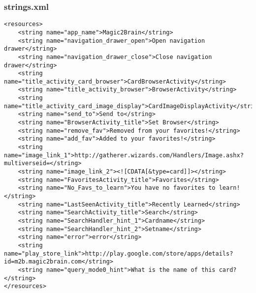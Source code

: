 \subsubsection*{strings.xml}
\begin{lstlisting}
<resources>
    <string name="app_name">Magic2Brain</string>
    <string name="navigation_drawer_open">Open navigation drawer</string>
    <string name="navigation_drawer_close">Close navigation drawer</string>
    <string name="title_activity_card_browser">CardBrowserActivity</string>
    <string name="title_activity_browser">BrowserActivity</string>
    <string name="title_activity_card_image_display">CardImageDisplayActivity</string>
    <string name="send_to">Send to</string>
    <string name="BrowserActivity_title">Set Browser</string>
    <string name="remove_fav">Removed from your favorites!</string>
    <string name="add_fav">Added to your favorites!</string>
    <string name="image_link_1">http://gatherer.wizards.com/Handlers/Image.ashx?multiverseid=</string>
    <string name="image_link_2"><![CDATA[&type=card]]></string>
    <string name="FavoritesActivity_title">Favorites</string>
    <string name="No_Favs_to_learn">You have no favorites to learn!</string>
    <string name="LastSeenActivity_title">Recently Learned</string>
    <string name="SearchActivity_title">Search</string>
    <string name="SearchHandler_hint_1">Cardname</string>
    <string name="SearchHandler_hint_2">Setname</string>
    <string name="error">error</string>
    <string name="play_store_link">http://play.google.com/store/apps/details?id=m2b.magic2brain.com</string>
    <string name="query_mode0_hint">What is the name of this card?</string>
</resources>
\end{lstlisting}

